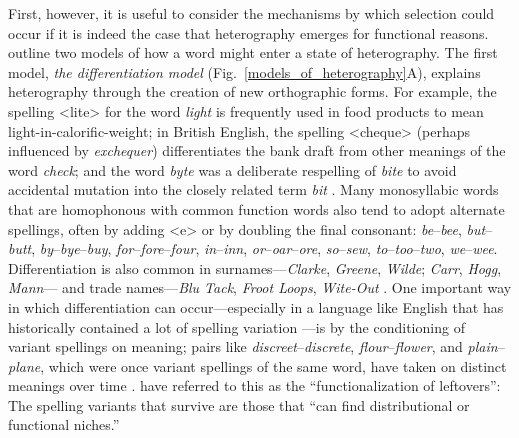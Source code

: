 \documentclass[doc,biblatex]{apa7}
\begin{document}
First, however, it is useful to consider the mechanisms by which selection could occur if it is indeed the case that heterography emerges for functional reasons. \textcite[pp.~325--326]{Berg:2021} outline two models of how a word might enter a state of heterography. The first model, \textit{the differentiation model} (Fig.~\ref{models_of_heterography}A), explains heterography through the creation of new orthographic forms. For example, the spelling <lite> for the word \textit{light} is frequently used in food products to mean light-in-calorific-weight; in British English, the spelling <cheque> (perhaps influenced by \textit{exchequer}) differentiates the bank draft from other meanings of the word \textit{check}; and the word \textit{byte} was a deliberate respelling of \textit{bite} to avoid accidental mutation into the closely related term \textit{bit} \parencite{Buchholz:1977}. Many monosyllabic words that are homophonous with common function words also tend to adopt alternate spellings, often by adding <e> or by doubling the final consonant: \textit{be}--\textit{bee}, \textit{but}--\textit{butt}, \textit{by}--\textit{bye}--\textit{buy}, \textit{for}--\textit{fore}--\textit{four}, \textit{in}--\textit{inn}, \textit{or}--\textit{oar}--\textit{ore}, \textit{so}--\textit{sew}, \textit{to}--\textit{too}--\textit{two}, \textit{we}--\textit{wee}. Differentiation is also common in surnames---\textit{Clarke}, \textit{Greene}, \textit{Wilde}; \textit{Carr}, \textit{Hogg}, \textit{Mann}--- and trade names---\textit{Blu Tack}, \textit{Froot Loops}, \textit{Wite-Out} \parencite[§~6]{Carney:1994}. One important way in which differentiation can occur---especially in a language like English that has historically contained a lot of spelling variation \parencite{Nevalainen:2012, Stenroos:2016}---is by the conditioning of variant spellings on meaning; pairs like \textit{discreet}--\textit{discrete}, \textit{flour}--\textit{flower}, and \textit{plain}--\textit{plane}, which were once variant spellings of the same word, have taken on distinct meanings over time \parencite[§~5.4]{Carney:1994}. \textcite[p.~58]{Berg:2017} have referred to this as the ``functionalization of leftovers'': The spelling variants that survive are those that ``can find distributional or functional niches.''
\end{document}
